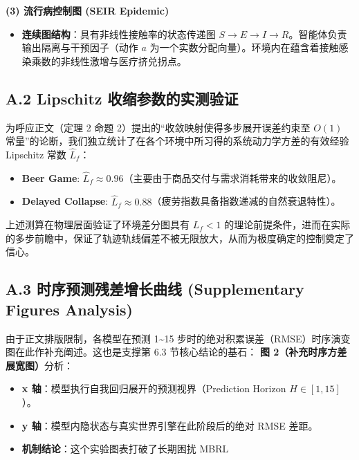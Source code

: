 \documentclass[UTF8]{ctexart}
\begin{document}
\textbf{(3) 流行病控制图 (SEIR Epidemic)}

\begin{itemize}
\item \textbf{连续图结构}：具有非线性接触率的状态传递图 \(S \to E \to I \to R\)。智能体负责输出隔离与干预因子（动作 \(a\) 为一个实数分配向量）。环境内在蕴含着接触感染乘数的非线性激增与医疗挤兑拐点。
\end{itemize}

\hypertarget{a.2-lipschitz-ux6536ux7f29ux53c2ux6570ux7684ux5b9eux6d4bux9a8cux8bc1}{%
\subsection{A.2 Lipschitz
收缩参数的实测验证}\label{a.2-lipschitz-ux6536ux7f29ux53c2ux6570ux7684ux5b9eux6d4bux9a8cux8bc1}}

为呼应正文（定理 2 命题 2）提出的``收敛映射使得多步展开误差约束至
\(O(1)\)
常量''的论断，我们独立统计了在各个环境中所习得的系统动力学方差的有效经验
Lipschitz 常数 \(\hat{L}_f\)：

\begin{itemize}
\item \textbf{Beer Game}: \(\hat{L}_f \approx 0.96\)（主要由于商品交付与需求消耗带来的收敛阻尼）。
\item \textbf{Delayed Collapse}: \(\hat{L}_f \approx 0.88\)（疲劳指数具备指数递减的自然衰退特性）。
\end{itemize}

上述测算在物理层面验证了环境差分图具有 \(L_f < 1\)
的理论前提条件，进而在实际的多步前瞻中，保证了轨迹轨线偏差不被无限放大，从而为极度确定的控制奠定了信心。

\hypertarget{a.3-ux65f6ux5e8fux9884ux6d4bux6b8bux5deeux589eux957fux66f2ux7ebf-supplementary-figures-analysis}{%
\subsection{A.3 时序预测残差增长曲线 (Supplementary Figures
Analysis)}\label{a.3-ux65f6ux5e8fux9884ux6d4bux6b8bux5deeux589eux957fux66f2ux7ebf-supplementary-figures-analysis}}

由于正文排版限制，各模型在预测 1\textasciitilde{}15
步时的绝对积累误差（RMSE）时序演变图在此作补充阐述。这也是支撑第 6.3
节核心结论的基石： \textbf{图 2（补充时序方差展宽图）}分析：

\begin{itemize}
\item \textbf{x 轴}：模型执行自我回归展开的预测视界（Prediction Horizon \(H \in [1, 15]\)）。
\item \textbf{y 轴}：模型内隐状态与真实世界引擎在此阶段后的绝对 RMSE 差距。
\item \textbf{机制结论}：这个实验图表打破了长期困扰 MBRL
\end{itemize}
\end{document}
